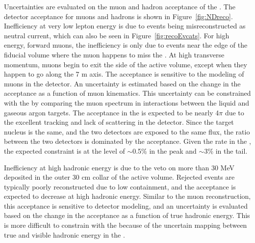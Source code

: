 Uncertainties are evaluated on the muon and hadron acceptance of the . The detector acceptance for muons and hadrons is shown in Figure~\ref{fig:NDreco}. Inefficiency at very low lepton energy is due to events being misreconstructed as neutral current, which can also be seen in Figure~\ref{fig:recoEvcats}. For high energy, forward muons, the inefficiency is only due to events near the edge of the fiducial volume where the muon happens to miss the . At high transverse momentum, muons begin to exit the side of the  active volume, except when they happen to go along the 7 m axis. The acceptance is sensitive to the modeling of muons in the detector. An uncertainty is estimated based on the change in the acceptance as a function of muon kinematics. This uncertainty can be constrained with the  by comparing the muon spectrum in  interactions between the liquid and gaseous argon targets. The acceptance in the  is expected to be nearly 4$\pi$ due to the excellent tracking and lack of scattering in the detector. Since the target nucleus is the same, and the two detectors are exposed to the same flux, the ratio between the two detectors is dominated by the  acceptance. Given the rate in the , the expected constraint is at the level of $\sim$0.5\% in the peak and $\sim$3\% in the tail.

Inefficiency at high hadronic energy is due to the veto on more than 30 MeV deposited in the outer 30 cm collar of the active volume. Rejected events are typically poorly reconstructed due to low containment, and the acceptance is expected to decrease at high hadronic energy. Similar to the muon reconstruction, this acceptance is sensitive to detector modeling, and an uncertainty is evaluated based on the change in the acceptance as a function of true hadronic energy. This is more difficult to constrain with the  because of the uncertain mapping between true and visible hadronic energy in the .

